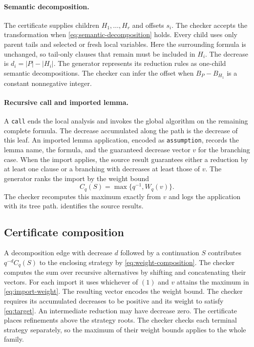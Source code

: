 \documentclass[10pt,twoside]{article}
\theoremstyle{definition}
\theoremstyle{remark}
\begin{document}
\paragraph{Semantic decomposition.}
The certificate supplies children $H_1,\ldots,H_r$ and offsets $s_i$. The
checker accepts the transformation when
\cref{eq:semantic-decomposition} holds.
Every child uses only parent tails and selected or fresh local variables.
Here the surrounding formula is unchanged, so tail-only clauses that remain
must be included in $H_i$. The decrease is
$d_i=|P|-|H_i|$. The generator represents its reduction rules as one-child
semantic decompositions. The checker can infer the offset when
$B_P-B_{H_1}$ is a constant nonnegative integer.

\paragraph{Recursive call and imported lemma.}
A \texttt{call} ends the local analysis and invokes the global algorithm on
the remaining complete formula. The decrease accumulated along the path is
the decrease of this leaf. An imported lemma application, encoded as
\texttt{assumption}, records the lemma name, the formula, and the guaranteed
decrease vector $v$ for the branching case. When the import applies, the
source result guarantees either a reduction by at least one clause or a
branching with decreases at least those of $v$. The generator ranks the
import by the weight bound
\begin{equation}
 C_q(S)=\max\{q^{-1},W_q(v)\}.
 \label{eq:import-weight}
\end{equation}
The checker recomputes this maximum exactly from $v$ and logs the application
with its tree path.  identifies the source results.

\subsection{Certificate composition}
\label{sec:checker}

A decomposition edge with decrease $d$ followed by a continuation $S$
contributes $q^{-d}C_q(S)$ to the enclosing strategy by
\cref{eq:weight-composition}. The checker computes the sum over recursive
alternatives by shifting and concatenating their vectors. For each import
it uses whichever of $(1)$ and $v$ attains the maximum in
\cref{eq:import-weight}.
The resulting vector encodes the weight bound. The checker requires its
accumulated decreases to be positive and its weight to satisfy
\cref{eq:target}. An intermediate reduction may have decrease zero.
The certificate places refinements above the strategy roots. The checker
checks each terminal strategy separately, so the maximum of their weight
bounds applies to the whole family.
\end{document}
